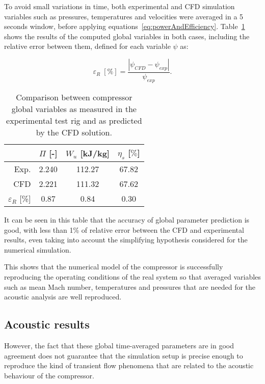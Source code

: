 To avoid small variations in time, both experimental and CFD simulation variables such as pressures, temperatures and velocities were averaged in a 5 seconds window, before applying equations~\ref{eq:powerAndEfficiency}. Table~\ref{tab:cfd_globalVariables} shows the results of the computed global variables in both cases, including the relative error between them, defined for each variable $\psi$ as:

\begin{equation}\label{eq:relative_error_cfd}
	\varepsilon_R\;[\%]=\frac{\left| \psi_{CFD}-\psi_{exp} \right|}{\psi_{exp}}.
\end{equation}

\begin{table}[htb]
\centering
\caption{Comparison between compressor global variables as measured in the experimental test rig and as predicted by the CFD solution.}
\footnotesize
	\begin{tabular}{rccc}
	\toprule
	 & $\varPi$ [-] & $W_u$ [kJ/kg] & $\eta_s$ [$\%$] \\\midrule
	Exp. & 2.240 & 112.27 & 67.82  \\
	CFD & 2.221 & 111.32 & 67.62  \\\midrule
	$\varepsilon_R$ [\%] & 0.87 & 0.84 & 0.30  \\ \bottomrule
	\end{tabular}
\label{tab:cfd_globalVariables}
\end{table}

It can be seen in this table that the accuracy of global parameter prediction is good, with less than 1\% of relative error between the CFD and experimental results, even taking into account the simplifying hypothesis considered for the numerical simulation.

This shows that the numerical model of the compressor is successfully reproducing the operating conditions of the real system so that averaged variables such as mean Mach number, temperatures and pressures that are needed for the acoustic analysis are well reproduced.

\subsection{Acoustic results}

However, the fact that these global time-averaged parameters are in good agreement does not guarantee that the simulation setup is precise enough to reproduce the kind of transient flow phenomena that are related to the acoustic behaviour of the compressor.

